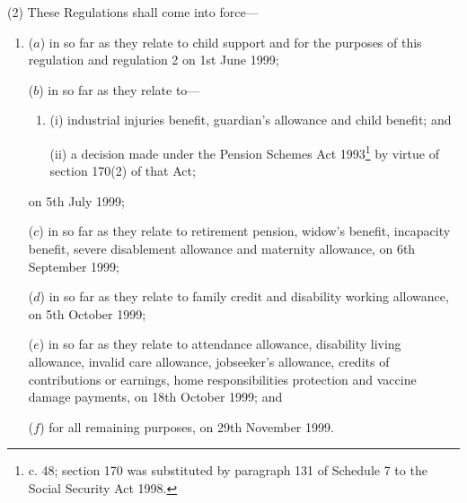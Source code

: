 \documentclass[12pt,a4paper]{article}
\begin{document}
(2) These Regulations shall come into force—
\begin{enumerate}\item[]
($a$) in so far as they relate to child support and for the purposes of this regulation and regulation 2 on 1st June 1999;

($b$) in so far as they relate to—
\begin{enumerate}\item[]
(i) industrial injuries benefit, guardian’s allowance and child benefit; and

(ii) a decision made under the Pension Schemes Act 1993\footnote{ c. 48; section 170 was substituted by paragraph 131 of Schedule 7 to the Social Security Act 1998.} by virtue of section 170(2) of that Act;
\end{enumerate}
on 5th July 1999;

($c$) in so far as they relate to retirement pension, widow’s benefit, incapacity benefit, severe disablement allowance and maternity allowance, on 6th September 1999;

($d$) in so far as they relate to family credit and disability working allowance, on 5th October 1999;

($e$) in so far as they relate to attendance allowance, disability living allowance, invalid care allowance, jobseeker’s allowance, credits of contributions or earnings, home responsibilities protection and vaccine damage payments, on 18th October 1999; and

($f$) for all remaining purposes, on 29th November 1999.
\end{enumerate}
\end{document}
